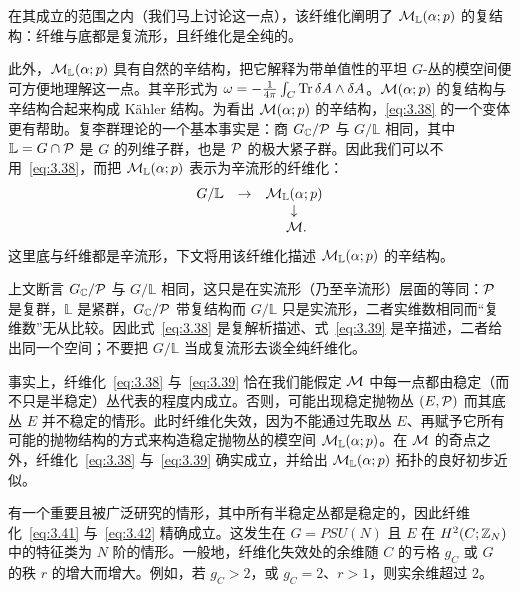 在其成立的范围之内（我们马上讨论这一点），该纤维化阐明了 ${\mathcal{M}}_\mathbb{L}(\alpha;p)$ 的复结构：纤维与底都是复流形，且纤维化是全纯的。

此外，${\mathcal{M}}_\mathbb{L}(\alpha;p)$ 具有自然的辛结构，把它解释为带单值性的平坦 $G$-丛的模空间便可方便地理解这一点。其辛形式为 $\omega=-{1\over 4\pi}\int_C{\rm Tr}\,\delta A\wedge\delta A$。${\mathcal{M}}(\alpha;p)$ 的复结构与辛结构合起来构成 Kähler 结构。为看出 ${\mathcal{M}}(\alpha;p)$ 的辛结构，\eqref{eq:3.38} 的一个变体更有帮助。复李群理论的一个基本事实是：商 $G_{\mathbb{C}}/\mathcal{P}$ 与 $G/\mathbb{L}$ 相同，其中 $\mathbb{L}=G\cap \mathcal{P}$ 是 $G$ 的列维子群，也是 $\mathcal{P}$ 的极大紧子群。因此我们可以不用~\eqref{eq:3.38}，而把 ${\mathcal{M}}_\mathbb{L}(\alpha;p)$ 表示为辛流形的纤维化：
\setcounter{equation}{38}
\begin{equation}\label{eq:3.39}
  \begin{matrix}G/\mathbb{L}&\to& {\mathcal{M}}_\mathbb{L}(\alpha;p)\\
                                &   & \downarrow \\
                                & & ~{\mathcal{M}}. \end{matrix}
\end{equation}
这里底与纤维都是辛流形，下文将用该纤维化描述 ${\mathcal{M}}_\mathbb{L}(\alpha;p)$ 的辛结构。

\begin{yizhu}[易错点]上文断言 $G_{\mathbb{C}}/\mathcal{P}$ 与 $G/\mathbb{L}$ 相同，这只是在实流形（乃至辛流形）层面的等同：$\mathcal{P}$ 是复群，$\mathbb{L}$ 是紧群，$G_{\mathbb{C}}/\mathcal{P}$ 带复结构而 $G/\mathbb{L}$ 只是实流形，二者实维数相同而“复维数”无从比较。因此式~\eqref{eq:3.38} 是复解析描述、式~\eqref{eq:3.39} 是辛描述，二者给出同一个空间；不要把 $G/\mathbb{L}$ 当成复流形去谈全纯纤维化。\end{yizhu}

事实上，纤维化~\eqref{eq:3.38} 与~\eqref{eq:3.39} 恰在我们能假定 ${\mathcal{M}}$ 中每一点都由稳定（而不只是半稳定）丛代表的程度内成立。否则，可能出现稳定抛物丛 $(E,\mathcal{P})$ 而其底丛 $E$ 并不稳定的情形。此时纤维化失效，因为不能通过先取丛 $E$、再赋予它所有可能的抛物结构的方式来构造稳定抛物丛的模空间 ${\mathcal{M}}_\mathbb{L}(\alpha;p)$。在 ${\mathcal{M}}$ 的奇点之外，纤维化~\eqref{eq:3.38} 与~\eqref{eq:3.39} 确实成立，并给出 ${\mathcal{M}}_\mathbb{L}(\alpha;p)$ 拓扑的良好初步近似。

有一个重要且被广泛研究的情形，其中所有半稳定丛都是稳定的，因此纤维化~\eqref{eq:3.41} 与~\eqref{eq:3.42} 精确成立。这发生在 $G=PSU(N)$ 且 $E$ 在 $H^2(C;{\mathbb{Z}}_N)$ 中的特征类为 $N$ 阶的情形。一般地，纤维化失效处的余维随 $C$ 的亏格 $g_C$ 或 $G$ 的秩 $r$ 的增大而增大。例如，若 $g_C>2$，或 $g_C=2$、$r>1$，则实余维超过 2。

